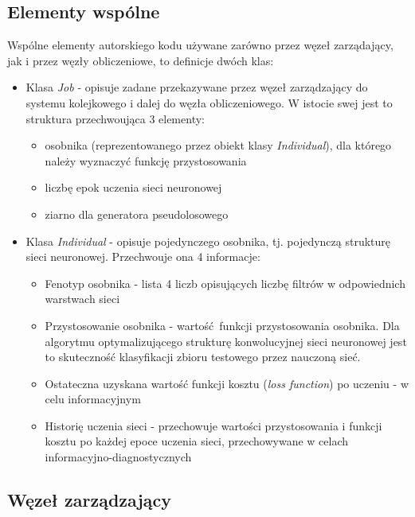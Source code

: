 \subsection{Elementy wspólne}
Wspólne elementy autorskiego kodu używane zarówno przez węzeł zarządający, jak i przez węzły obliczeniowe, to definicje dwóch klas:
\begin{itemize}
  \item Klasa \textit{Job} - opisuje zadane przekazywane przez węzeł zarządzający do systemu kolejkowego i dalej do węzła obliczeniowego.
        W istocie swej jest to struktura przechwoująca 3 elementy:
        \begin{itemize}
          \item osobnika (reprezentowanego przez obiekt klasy \textit{Individual}), dla którego należy wyznaczyć funkcję przystosowania
          \item liczbę epok uczenia sieci neuronowej
          \item ziarno dla generatora pseudolosowego
        \end{itemize}
  \item Klasa \textit{Individual} - opisuje pojedynczego osobnika, tj. pojedynczą strukturę sieci neuronowej.
        Przechwouje ona 4 informacje:
        \begin{itemize}
          \item Fenotyp osobnika - lista 4 liczb opisujących liczbę filtrów w odpowiednich warstwach sieci
          \item Przystosowanie osobnika - wartość funkcji przystosowania osobnika.
                Dla algorytmu optymalizującego strukturę konwolucyjnej sieci neuronowej jest to skuteczność klasyfikacji zbioru testowego przez nauczoną sieć.
          \item Ostateczna uzyskana wartość funkcji kosztu (\textit{loss function}) po uczeniu - w celu informacyjnym
          \item Historię uczenia sieci - przechowuje wartości przystosowania i funkcji kosztu po każdej epoce uczenia sieci, przechowywane w celach informacyjno-diagnostycznych
        \end{itemize}
\end{itemize}


\subsection{Węzeł zarządzający}

